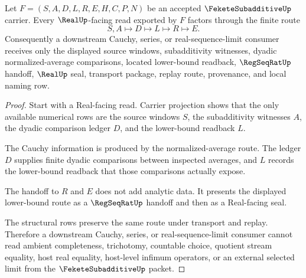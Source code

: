 \begin{theorem}
\label{thm:fekete-subadditive-cauchy-route}
Let $F=(S,A,D,L,R,E,H,C,P,N)$ be an accepted $\FeketeSubadditiveUp$ carrier. Every $\RealUp$-facing read exported by $F$ factors through the finite route
$$
S,A\longmapsto D\longmapsto L\longmapsto R\longmapsto E .
$$
Consequently a downstream Cauchy, series, or real-sequence-limit consumer receives only the displayed source windows, subadditivity witnesses, dyadic normalized-average comparisons, located lower-bound readback, $\RegSeqRatUp$ handoff, $\RealUp$ seal, transport package, replay route, provenance, and local naming row.
\end{theorem}
\begin{proof}
Start with a Real-facing read. Carrier projection shows that the only available numerical rows are the source windows $S$, the subadditivity witnesses $A$, the dyadic comparison ledger $D$, and the lower-bound readback $L$.

The Cauchy information is produced by the normalized-average route. The ledger $D$ supplies finite dyadic comparisons between inspected averages, and $L$ records the lower-bound readback that those comparisons actually expose.

The handoff to $R$ and $E$ does not add analytic data. It presents the displayed lower-bound route as a $\RegSeqRatUp$ handoff and then as a Real-facing seal.

The structural rows preserve the same route under transport and replay. Therefore a downstream Cauchy, series, or real-sequence-limit consumer cannot read ambient completeness, trichotomy, countable choice, quotient stream equality, host real equality, host-level infimum operators, or an external selected limit from the $\FeketeSubadditiveUp$ packet.
\end{proof}

